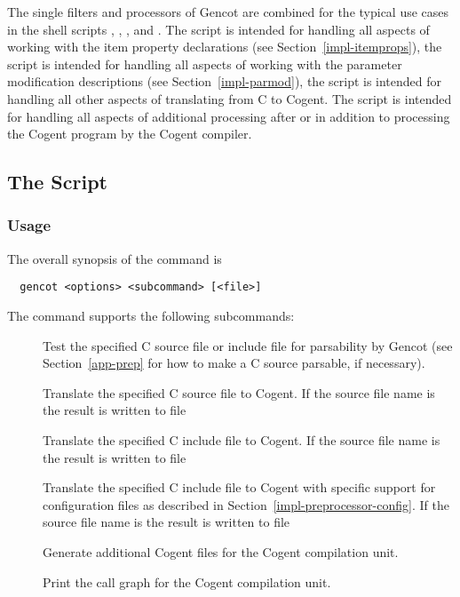 The single filters and processors of Gencot are combined for the typical use cases in the shell scripts
, , , and . The script  is intended for handling all 
aspects of working with the item property declarations (see Section~\ref{impl-itemprops}), the script  
is intended for handling all aspects
of working with the parameter modification descriptions (see Section~\ref{impl-parmod}), the script
 is intended for handling all other aspects of translating from C to Cogent. The script 
is intended for handling all aspects of additional processing after or in addition to processing the Cogent program by the 
Cogent compiler.

\subsection{The  Script}
\label{impl-all-gencot}

\subsubsection{Usage}

The overall synopsis of the  command is
\begin{verbatim}
  gencot <options> <subcommand> [<file>]
\end{verbatim}

The  command supports the following subcommands:
\begin{description}
\item[] Test the specified C source file or include file for parsability by Gencot (see Section~\ref{app-prep} for how to 
make a C source parsable, if necessary).

\item[] Translate the specified C source file to Cogent. If the source file name is  the result is
written to file 

\item[] Translate the specified C include file to Cogent. If the source file name is  the result is
written to file 

\item[] Translate the specified C include file to Cogent with specific support for configuration files as described
in Section~\ref{impl-preprocessor-config}. If the source file name is  the result is
written to file 

\item[] Generate additional Cogent files for the Cogent compilation unit.

\item[] Print the call graph for the Cogent compilation unit.

\end{description}

